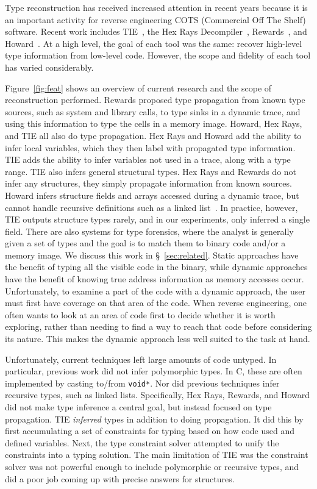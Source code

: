 Type reconstruction has received increased attention in recent years because it is an important activity for reverse engineering COTS (Commercial Off The Shelf) software. Recent work includes TIE~\cite{tie}, the Hex Rays Decompiler~\cite{ida}, Rewards~\cite{rewards}, and Howard~\cite{Slowinska2011}.  At a high level, the goal of each tool was the same: recover high-level type information from low-level code. However, the scope and fidelity of each tool has varied considerably.

Figure~\ref{fig:feat} shows an overview of current research and the scope of reconstruction performed. Rewards proposed type propagation from known type sources, such as system and library calls, to type sinks in a dynamic trace, and using this information to type the cells in a memory image. Howard, Hex Rays, and TIE all also do type propagation. Hex Rays and Howard add the ability to infer local variables, which they then label with propagated type information. TIE adds the ability to infer variables not used in a trace, along with a type range. TIE also infers general structural types.  Hex Rays and Rewards do not infer any structures, they simply propagate information from known sources. Howard infers structure fields and arrays accessed during a dynamic trace, but cannot handle recursive definitions such as a linked list~\cite{Slowinska2011}. In practice, however, TIE outputs structure types rarely, and in our experiments, only inferred a single field. There are also systems for type forensics, where the analyst is generally given a set of types and the goal is to match them to binary code and/or a memory image. We discuss this work in \S~\ref{sec:related}. Static approaches have the benefit of typing all the visible code in the binary, while dynamic approaches have the benefit of knowing true address information as memory accesses occur. Unfortunately, to examine a part of the code with a dynamic approach, the user must first have coverage on that area of the code. When reverse engineering, one often wants to look at an area of code first to decide whether it is worth exploring, rather than needing to find a way to reach that code before considering its nature. This makes the dynamic approach less well suited to the task at hand.

Unfortunately, current techniques left large amounts of code untyped. In particular, previous work did not infer polymorphic types. In C, these are often implemented by casting to/from \texttt{void*}. Nor did previous techniques infer recursive types, such as linked lists. Specifically, Hex Rays, Rewards, and Howard did not make type inference a central goal, but instead focused on type propagation. TIE \emph{inferred} types in addition to doing propagation. It did this by first accumulating a set of constraints for typing based on how code used and defined variables. Next, the type constraint solver attempted to unify the constraints into a typing solution. The main limitation of TIE was the constraint solver was not powerful enough to include polymorphic or recursive types, and did a poor job coming up with precise answers for structures. 


